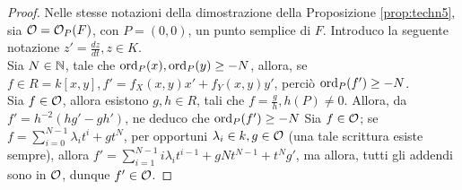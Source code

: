         \begin{proof}
            Nelle stesse notazioni della dimostrazione della Proposizione \ref{prop:techn5}, sia $\mathcal{O} = \mathcal{O}_P(F)$, con $P = (0,0)$, 
            un punto semplice di $F$. Introduco la seguente notazione $z' = \frac{dz}{dt}, z \in K$.\\
            Sia $N \in \mathbb{N}$, tale che $\operatorname{ord}_P(x),\operatorname{ord}_P(y) \geq -N$, allora, se $f \in R = k[x,y], f' = f_X(x,y)x' + f_Y(x,y)y'$, perciò 
            $\operatorname{ord}_P(f') \geq -N$. \\
            Sia $f \in \mathcal{O}$, allora esistono $g,h \in R$, tali che $f = \frac{g}{h}, h(P) \neq 0$. Allora, da $f' = h^{-2}(hg'-gh')$, ne deduco che $\operatorname{ord}_P(f') \geq -N$
            Sia $f \in \mathcal{O}$; se $f = \sum_{i=0}^{N-1} \lambda_i t^i + gt^N$, per opportuni $\lambda_i \in k, g \in \mathcal{O}$ (una tale scrittura 
            esiste sempre), allora $f' = \sum_{i=1}^{N-1} i \lambda_i t^{i-1} + gNt^{N-1} + t^Ng'$, ma allora, tutti gli addendi sono in $\mathcal{O}$, dunque 
            $f ' \in \mathcal{O}$.
        \end{proof}

    \newpage
